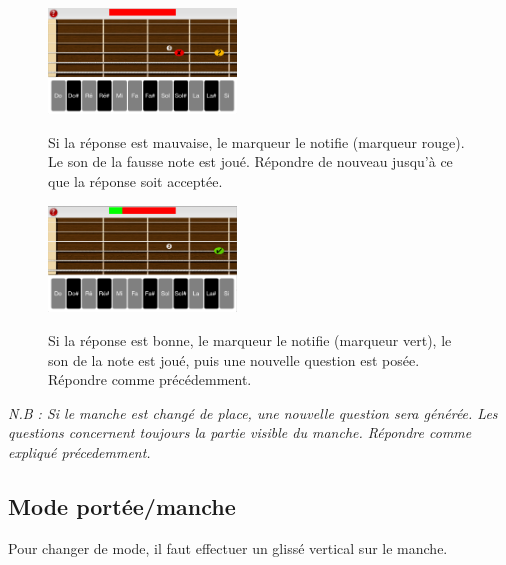 \documentclass{scrreprt}
\begin{document}
\begin{figure}[!ht]
  \begin{minipage}{6cm}
      \includegraphics[width=5cm]{images/clavier_first_bad_question_2.png}
  \end{minipage}\hfill
  \begin{minipage}{10cm}
  {Si la réponse est mauvaise, le marqueur le notifie (marqueur rouge). Le son de la fausse note est joué. Répondre de nouveau jusqu'à ce que la réponse soit acceptée.}
   \end{minipage}
\end{figure}


\begin{figure}[!ht]
  \begin{minipage}{6cm}
      \includegraphics[width=5cm]{images/clavier_first_good_question.png}
  \end{minipage}\hfill
  \begin{minipage}{10cm}
  {Si la réponse est bonne, le marqueur le notifie (marqueur vert), le son de la note est joué, puis une nouvelle question est posée. Répondre comme précédemment.}
   \end{minipage}
\end{figure}

\bigbreak
\textit{N.B : Si le manche est changé de place, une nouvelle question sera générée. Les questions concernent toujours la partie visible du manche. Répondre comme expliqué précedemment.}
\newpage

\subsection{Mode portée/manche}

Pour changer de mode, il faut effectuer un glissé vertical sur le manche.
\end{document}
